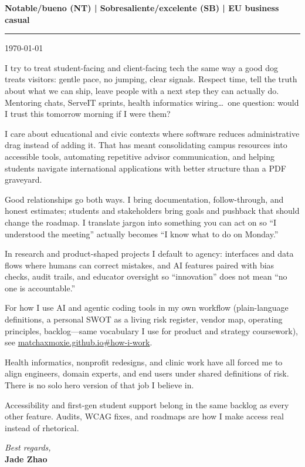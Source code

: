 \documentclass[11pt]{article}
\begin{document}

\vspace{0.25em}\newline\noindent\textbf{Notable/bueno (NT) \;|\; Sobresaliente/excelente (SB) \;|\; EU business casual}\n

\vspace{0.5em}
\noindent\rule{\linewidth}{1pt}
\vspace{0.75em}

\noindent\today

\vspace{0.75em}

I try to treat student-facing and client-facing tech the same way a good dog treats visitors: gentle pace, no jumping, clear signals. Respect time, tell the truth about what we can ship, leave people with a next step they can actually do. Mentoring chats, ServeIT sprints, health informatics wiring\ldots\ one question: would I trust this tomorrow morning if I were them?

I care about educational and civic contexts where software reduces administrative drag instead of adding it. That has meant consolidating campus resources into accessible tools, automating repetitive advisor communication, and helping students navigate international applications with better structure than a PDF graveyard.

Good relationships go both ways. I bring documentation, follow-through, and honest estimates; students and stakeholders bring goals and pushback that should change the roadmap. I translate jargon into something you can act on so ``I understood the meeting'' actually becomes ``I know what to do on Monday.''

In research and product-shaped projects I default to agency: interfaces and data flows where humans can correct mistakes, and AI features paired with bias checks, audit trails, and educator oversight so ``innovation'' does not mean ``no one is accountable.''

For how I use AI and agentic coding tools in my own workflow (plain-language definitions, a personal SWOT as a living risk register, vendor map, operating principles, backlog---same vocabulary I use for product and strategy coursework), see \href{https://matchaxmoxie.github.io/matchaxmoxie/\#how-i-work}{matchaxmoxie.github.io\#how-i-work}.

Health informatics, nonprofit redesigns, and clinic work have all forced me to align engineers, domain experts, and end users under shared definitions of risk. There is no solo hero version of that job I believe in.

Accessibility and first-gen student support belong in the same backlog as every other feature. Audits, WCAG fixes, and roadmaps are how I make access real instead of rhetorical.

\vspace{1.5em}
\noindent\textit{Best regards,}\\
\textbf{Jade Zhao}
\end{document}
